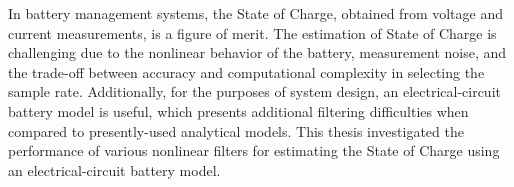 In battery management systems, the State of Charge, obtained from voltage and current measurements, is a figure of merit.
The estimation of State of Charge is challenging due to the nonlinear behavior of the battery, measurement noise, and the trade-off between accuracy and computational complexity in selecting the sample rate.
Additionally, for the purposes of system design, an electrical-circuit battery model is useful, which presents additional filtering difficulties when compared to presently-used analytical models.
This thesis investigated the performance of various nonlinear filters for estimating the State of Charge using an electrical-circuit battery model.
